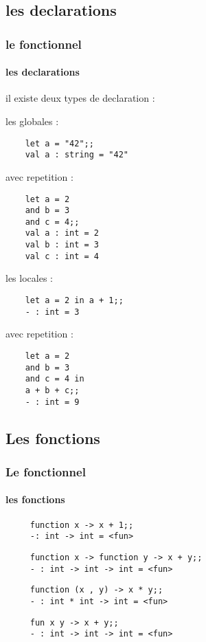     \subsection{les declarations}
\begin{frame}[fragile]
      \frametitle{le fonctionnel}
      \framesubtitle{les declarations}
      il existe deux types de declaration :
     \begin{minipage}[t]{5cm}
	les globales :\\
	\begin{lstlisting}
	let a = "42";;
	val a : string = "42"
	\end{lstlisting}
	avec repetition :
	\begin{lstlisting}
	let a = 2
	and b = 3
	and c = 4;;
	val a : int = 2
	val b : int = 3
	val c : int = 4
	\end{lstlisting}
      \end{minipage}
      \begin{minipage}[t]{5cm}
	les locales :\\
	\begin{lstlisting}
	let a = 2 in a + 1;;
	- : int = 3
	\end{lstlisting}
	avec repetition :
	\begin{lstlisting}
	let a = 2
	and b = 3
	and c = 4 in
	a + b + c;;
	- : int = 9
	\end{lstlisting}
      \end{minipage}
\end{frame}
    \subsection{Les fonctions}
\begin{frame}[fragile]
      \frametitle{Le fonctionnel}
      \framesubtitle{les fonctions}
      \begin{minipage}[t]{7cm}
	\begin{center}
	\begin{itemize}
    \begin{lstlisting}
     function x -> x + 1;;
     -: int -> int = <fun>
    \end{lstlisting}
    \begin{lstlisting}
     function x -> function y -> x + y;;
     - : int -> int -> int = <fun>
    \end{lstlisting}
    \begin{lstlisting}
     function (x , y) -> x * y;;
     - : int * int -> int = <fun>
    \end{lstlisting}
   \begin{lstlisting}
     fun x y -> x + y;;
     - : int -> int -> int = <fun>
    \end{lstlisting}
  \end{itemize}
  \end{center}
  \end{minipage}
\end{frame}

